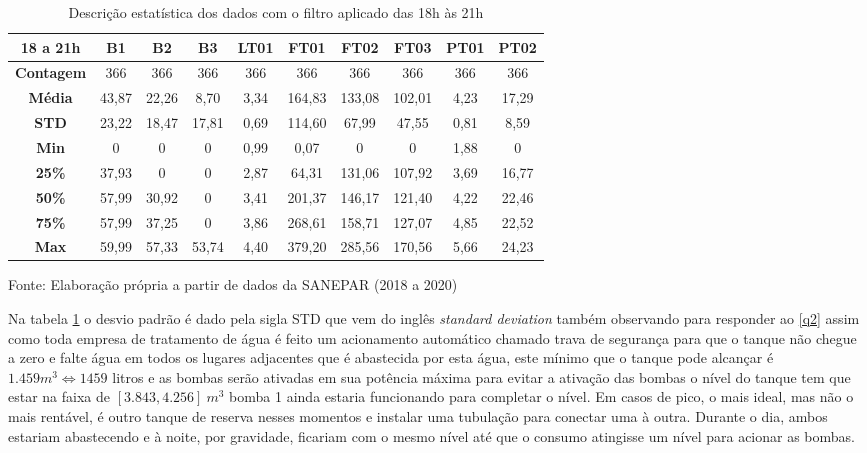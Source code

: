 \begin{table}[H]
	\centering
	\caption{Descrição estatística dos dados com o filtro aplicado das 18h às 21h}\label{tb:est}
	\begin{tabular}{@{}cccccccccc@{}}
		\toprule
		\textbf{18 a 21h}  & \textbf{B1} & \textbf{B2} & \textbf{B3} & \textbf{LT01} & \textbf{FT01} & \textbf{FT02} & \textbf{FT03} & \textbf{PT01} & \textbf{PT02} \\ \midrule
		\textbf{Contagem} & 366         & 366         & 366         & 366           & 366           & 366           & 366           & 366           & 366           \\
		\textbf{Média}    & 43,87       & 22,26       & 8,70        & 3,34          & 164,83        & 133,08        & 102,01        & 4,23          & 17,29         \\
		\textbf{STD}      & 23,22       & 18,47       & 17,81       & 0,69          & 114,60        & 67,99         & 47,55         & 0,81          & 8,59          \\
		\textbf{Min}      & 0           & 0           & 0           & 0,99          & 0,07          & 0             & 0             & 1,88          & 0             \\
		\textbf{25\%}     & 37,93       & 0           & 0           & 2,87          & 64,31         & 131,06        & 107,92        & 3,69          & 16,77         \\
		\textbf{50\%}     & 57,99       & 30,92       & 0           & 3,41          & 201,37        & 146,17        & 121,40        & 4,22          & 22,46         \\
		\textbf{75\%}     & 57,99       & 37,25       & 0           & 3,86          & 268,61        & 158,71        & 127,07        & 4,85          & 22,52         \\
		\textbf{Max}      & 59,99       & 57,33       & 53,74       & 4,40          & 379,20        & 285,56        & 170,56        & 5,66          & 24,23         \\ \bottomrule
	\end{tabular}
	
	Fonte: Elaboração própria a partir de dados da SANEPAR (2018 a 2020)
\end{table}

Na tabela \ref{tb:est} o desvio padrão é dado pela sigla STD que vem do inglês \textit{standard deviation} também observando para responder ao \ref{q2} assim como toda empresa de tratamento de água é feito um acionamento automático chamado trava de segurança para que o tanque não chegue a zero e falte água em todos os lugares adjacentes que é abastecida por esta água, este mínimo que o tanque pode alcançar é $1.459 m^3\Longleftrightarrow 1459 $ litros e as bombas serão ativadas em sua potência máxima para evitar a ativação das bombas o nível do tanque tem que estar na faixa de $[3.843,4.256]\ m^3$ bomba 1 ainda estaria funcionando para completar o nível. Em casos de pico, o mais ideal, mas não o mais rentável, é outro tanque de reserva nesses momentos e instalar uma tubulação para conectar uma à outra. Durante o dia, ambos estariam abastecendo e à noite, por gravidade, ficariam com o mesmo nível até que o consumo atingisse um nível para acionar as bombas.  



